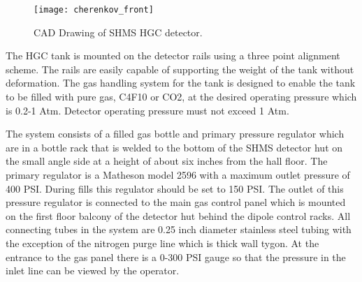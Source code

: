 {%
%
%
%
%
%
%
%








\begin{figure}[ht]
\centering
\texttt{[image: cherenkov\_front]}
\caption{CAD Drawing of SHMS HGC detector. \label{fig:hgc}}
\end{figure}



The HGC tank is mounted on the detector rails using a three point
alignment scheme. The rails are easily capable of supporting the
weight of the tank without deformation. The gas handling system for
the tank is designed to enable the tank to be filled with pure gas,
C4F10 or CO2, at the desired operating pressure which is 0.2-1
Atm. Detector operating pressure must not exceed 1 Atm.

{ \color{red}

The system consists of a filled gas bottle and primary pressure
regulator which are in a bottle rack that is welded to the bottom of
the SHMS detector hut on the small angle side at a height of about six
inches from the hall floor. The primary regulator is a Matheson model
2596 with a maximum outlet pressure of 400 PSI.  During fills this
regulator should be set to 150 PSI. The outlet of this pressure
regulator is connected to the main gas control panel which is mounted
on the first floor balcony of the detector hut behind the dipole
control racks. All connecting tubes in the system are 0.25 inch
diameter stainless steel tubing with the exception of the nitrogen
purge line which is thick wall tygon. At the entrance to the gas panel
there is a 0-300 PSI gauge so that the pressure in the inlet line can
be viewed by the operator.


}}
